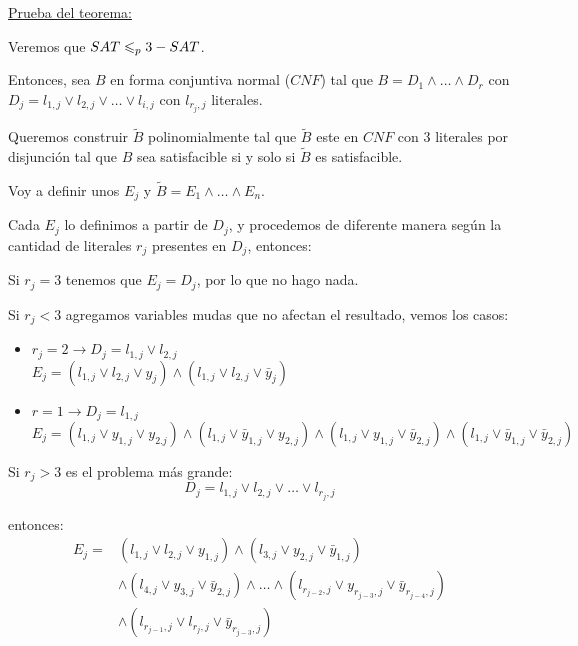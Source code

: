 \documentclass[12pt,a4paper]{article}
\begin{document}
\underline{Prueba del teorema:}
\medskip

Veremos que $SAT \leqslant_{p} 3-SAT$.
\medskip

Entonces, sea $B$ en forma conjuntiva normal ($CNF$) tal que 
$B = D_{1} \wedge \ldots \wedge D_{r}$ con 
$D_{j} = l_{1,j} \vee l_{2,j} \vee \ldots \vee l_{i,j}$ con $l_{r_{j},j}$ literales.
\medskip

Queremos construir $\widetilde{B}$ polinomialmente tal que $\widetilde{B}$ este en
$CNF$ con $3$ literales por disjunción tal que $B$ sea satisfacible si y solo si 
$\widetilde{B}$ es satisfacible.
\medskip

Voy a definir unos $E_{j}$ y $\widetilde{B} = E_{1} \wedge \ldots \wedge E_{n}$.
\medskip

Cada $E_{j}$ lo definimos a partir de $D_{j}$, y procedemos de diferente manera 
según la cantidad de literales $r_{j}$ presentes en $D_{j}$, entonces:
\medskip

Si $r_{j} = 3$ tenemos que $E_{j} = D_{j}$, por lo que no hago nada.
\medskip

Si $r_{j} < 3$ agregamos variables mudas que no afectan el resultado, vemos los casos:
\begin{itemize}
    \item $r_{j} = 2 \to D_{j}=l_{1,j}\vee l_{2,j}$\\
        $E_{j} = (l_{1,j} \vee l_{2,j} \vee y_{j}) \wedge (l_{1,j} \vee l_{2,j} \vee \bar{y}_{j})$
    \item $r=1 \to D_{j} = l_{1,j}$\\
        $E_{j} = (l_{1,j} \vee y_{1,j} \vee y_{2.j}) \wedge (l_{1,j} \vee \bar{y}_{1,j} \vee y_{2,j}) \wedge 
        (l_{1,j} \vee y_{1,j} \vee \bar{y}_{2,j}) \wedge (l_{1,j} \vee \bar{y}_{1,j} \vee \bar{y}_{2,j})$
\end{itemize}

Si $r_{j} > 3$ es el problema más grande:
$$D_{j} = l_{1,j} \vee l_{2,j} \vee \ldots \vee l_{r_{j},j}$$ 

entonces:
\begin{align*}
    E_{j} = &(l_{1,j} \vee l_{2,j} \vee y_{1,j}) \wedge (l_{3,j} \vee y_{2,j} \vee \bar{y}_{1,j}) \\
    &\wedge (l_{4,j} \vee y_{3,j} \vee \bar{y}_{2,j}) \wedge \ldots \wedge (l_{r_{j-2},j} \vee y_{r_{j-3},j} \vee \bar{y}_{r_{j-4},j})\\
    &\wedge (l_{r_{j-1},j} \vee l_{r_{j},j} \vee \bar{y}_{r_{j-3},j})
\end{align*}
\end{document}
